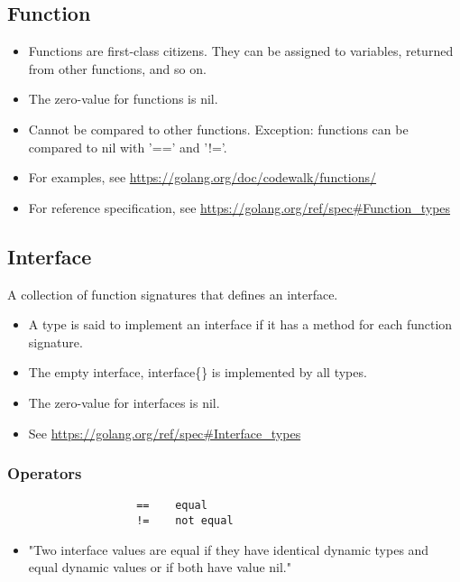 \documentclass{article}
\begin{document}
	\subsection{Function}	
		\begin{itemize}
			\item Functions are first-class citizens. They can be assigned to variables, returned from other functions, and so on.
			\item The zero-value for functions is \colorbox{code}{nil}.
			\item Cannot be compared to other functions. Exception: functions can be compared to \colorbox{code}{nil} with '==' and '!='.
			\item For examples, see \url{https://golang.org/doc/codewalk/functions/}
			\item For reference specification, see \url{https://golang.org/ref/spec#Function_types}
		\end{itemize}
		
	\subsection{Interface}
		A collection of function signatures that defines an interface. 
		\begin{itemize}
			\item A type is said to implement an interface if it has a method for each function signature.
			\item The empty interface, \colorbox{code}{interface\{\}} is implemented by all types. 
			\item The zero-value for interfaces is \colorbox{code}{nil}.
			\item See \url{https://golang.org/ref/spec#Interface_types}
		\end{itemize}
		\subsubsection{Operators}
			\begin{verbatim}
				    ==    equal
				    !=    not equal
			\end{verbatim}
			\begin{itemize}
				\item "Two interface values are equal if they have identical dynamic types and equal dynamic values or if both have value nil."
			\end{itemize}
		
\end{document}

